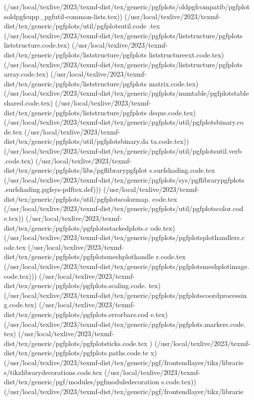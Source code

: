 (/usr/local/texlive/2023/texmf-dist/tex/generic/pgfplots/oldpgfcompatib/pgfplot
soldpgfsupp_pgfutil-common-lists.tex))
(/usr/local/texlive/2023/texmf-dist/tex/generic/pgfplots/util/pgfplotsutil.code
.tex
(/usr/local/texlive/2023/texmf-dist/tex/generic/pgfplots/liststructure/pgfplots
liststructure.code.tex)
(/usr/local/texlive/2023/texmf-dist/tex/generic/pgfplots/liststructure/pgfplots
liststructureext.code.tex)
(/usr/local/texlive/2023/texmf-dist/tex/generic/pgfplots/liststructure/pgfplots
array.code.tex)
(/usr/local/texlive/2023/texmf-dist/tex/generic/pgfplots/liststructure/pgfplots
matrix.code.tex)
(/usr/local/texlive/2023/texmf-dist/tex/generic/pgfplots/numtable/pgfplotstable
shared.code.tex)
(/usr/local/texlive/2023/texmf-dist/tex/generic/pgfplots/liststructure/pgfplots
deque.code.tex)
(/usr/local/texlive/2023/texmf-dist/tex/generic/pgfplots/util/pgfplotsbinary.co
de.tex
(/usr/local/texlive/2023/texmf-dist/tex/generic/pgfplots/util/pgfplotsbinary.da
ta.code.tex))
(/usr/local/texlive/2023/texmf-dist/tex/generic/pgfplots/util/pgfplotsutil.verb
.code.tex)
(/usr/local/texlive/2023/texmf-dist/tex/generic/pgfplots/libs/pgflibrarypgfplot
s.surfshading.code.tex
(/usr/local/texlive/2023/texmf-dist/tex/generic/pgfplots/sys/pgflibrarypgfplots
.surfshading.pgfsys-pdftex.def)))
(/usr/local/texlive/2023/texmf-dist/tex/generic/pgfplots/util/pgfplotscolormap.
code.tex
(/usr/local/texlive/2023/texmf-dist/tex/generic/pgfplots/util/pgfplotscolor.cod
e.tex))
(/usr/local/texlive/2023/texmf-dist/tex/generic/pgfplots/pgfplotsstackedplots.c
ode.tex)
(/usr/local/texlive/2023/texmf-dist/tex/generic/pgfplots/pgfplotsplothandlers.c
ode.tex
(/usr/local/texlive/2023/texmf-dist/tex/generic/pgfplots/pgfplotsmeshplothandle
r.code.tex
(/usr/local/texlive/2023/texmf-dist/tex/generic/pgfplots/pgfplotsmeshplotimage.
code.tex)))
(/usr/local/texlive/2023/texmf-dist/tex/generic/pgfplots/pgfplots.scaling.code.
tex)
(/usr/local/texlive/2023/texmf-dist/tex/generic/pgfplots/pgfplotscoordprocessin
g.code.tex)
(/usr/local/texlive/2023/texmf-dist/tex/generic/pgfplots/pgfplots.errorbars.cod
e.tex)
(/usr/local/texlive/2023/texmf-dist/tex/generic/pgfplots/pgfplots.markers.code.
tex)
(/usr/local/texlive/2023/texmf-dist/tex/generic/pgfplots/pgfplotsticks.code.tex
)
(/usr/local/texlive/2023/texmf-dist/tex/generic/pgfplots/pgfplots.paths.code.te
x)
(/usr/local/texlive/2023/texmf-dist/tex/generic/pgf/frontendlayer/tikz/librarie
s/tikzlibrarydecorations.code.tex
(/usr/local/texlive/2023/texmf-dist/tex/generic/pgf/modules/pgfmoduledecoration
s.code.tex))
(/usr/local/texlive/2023/texmf-dist/tex/generic/pgf/frontendlayer/tikz/librarie
